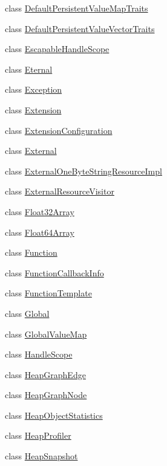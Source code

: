 \begin{DoxyCompactItemize}
\item 
class \hyperlink{classv8_1_1DefaultPersistentValueMapTraits}{Default\+Persistent\+Value\+Map\+Traits}
\item 
class \hyperlink{classv8_1_1DefaultPersistentValueVectorTraits}{Default\+Persistent\+Value\+Vector\+Traits}
\item 
class \hyperlink{classv8_1_1EscapableHandleScope}{Escapable\+Handle\+Scope}
\item 
class \hyperlink{classv8_1_1Eternal}{Eternal}
\item 
class \hyperlink{classv8_1_1Exception}{Exception}
\item 
class \hyperlink{classv8_1_1Extension}{Extension}
\item 
class \hyperlink{classv8_1_1ExtensionConfiguration}{Extension\+Configuration}
\item 
class \hyperlink{classv8_1_1External}{External}
\item 
class \hyperlink{classv8_1_1ExternalOneByteStringResourceImpl}{External\+One\+Byte\+String\+Resource\+Impl}
\item 
class \hyperlink{classv8_1_1ExternalResourceVisitor}{External\+Resource\+Visitor}
\item 
class \hyperlink{classv8_1_1Float32Array}{Float32\+Array}
\item 
class \hyperlink{classv8_1_1Float64Array}{Float64\+Array}
\item 
class \hyperlink{classv8_1_1Function}{Function}
\item 
class \hyperlink{classv8_1_1FunctionCallbackInfo}{Function\+Callback\+Info}
\item 
class \hyperlink{classv8_1_1FunctionTemplate}{Function\+Template}
\item 
class \hyperlink{classv8_1_1Global}{Global}
\item 
class \hyperlink{classv8_1_1GlobalValueMap}{Global\+Value\+Map}
\item 
class \hyperlink{classv8_1_1HandleScope}{Handle\+Scope}
\item 
class \hyperlink{classv8_1_1HeapGraphEdge}{Heap\+Graph\+Edge}
\item 
class \hyperlink{classv8_1_1HeapGraphNode}{Heap\+Graph\+Node}
\item 
class \hyperlink{classv8_1_1HeapObjectStatistics}{Heap\+Object\+Statistics}
\item 
class \hyperlink{classv8_1_1HeapProfiler}{Heap\+Profiler}
\item 
class \hyperlink{classv8_1_1HeapSnapshot}{Heap\+Snapshot}

\end{DoxyCompactItemize}
